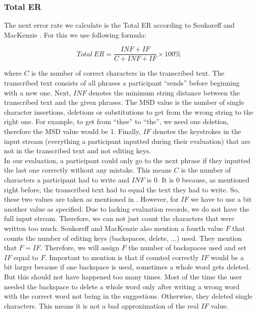 \subsubsection{Total ER}
\label{sec:total_er}
The next error rate we calculate is the Total ER according to Soukoreff and MacKenzie \cite{10.1145/642611.642632}. For this we use following formula:

\begin{equation}
    Total\ ER = \frac{INF + IF}{C + INF + IF} \times 100\%
\end{equation}

where $C$ is the number of correct characters in the transcribed text. The transcribed text consists of all phrases a participant ``sends'' before beginning with a new one. Next, $INF$ denotes the minimum string distance between the transcribed text and the given phrases. The MSD value is the number of single character insertions, deletions or substitutions to get from the wrong string to the right one. For example, to get from ``thee'' to ``the'', we need one deletion, therefore the MSD value would be 1. Finally, $IF$ denotes the keystrokes in the input stream (everything a participant inputted during their evaluation) that are not in the transcribed text and not editing keys.\\
In our evaluation, a participant could only go to the next phrase if they inputted the last one correctly without any mistake. This means $C$ is the number of characters a participant had to write and $INF$ is 0. It is 0 because, as mentioned right before, the transcribed text had to equal the text they had to write. So, these two values are taken as mentioned in \cite{10.1145/642611.642632}. However, for $IF$ we have to use a bit another value as specified. Due to lacking evaluation records, we do not have the full input stream. Therefore, we can not just count the characters that were written too much. Soukoreff and MacKenzie also mention a fourth value $F$ that counts the number of editing keys (backspaces, delete, ...) used. They mention that $F = IF$. Therefore, we will assign $F$ the number of backspaces used and set $IF$ equal to $F$. Important to mention is that if counted correctly $IF$ would be a bit larger because if one backspace is used, sometimes a whole word gets deleted. But this should not have happened too many times. Most of the time the user needed the backspace to delete a whole word only after writing a wrong word with the correct word not being in the suggestions. Otherwise, they deleted single characters. This means it is not a bad approximation of the real $IF$ value.
